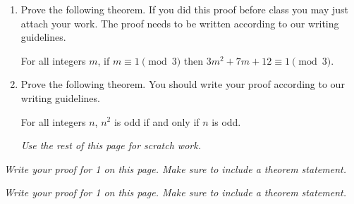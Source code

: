 \documentclass[11pt,answers]{exam}
\begin{document}
\begin{enumerate}
\item Prove the following theorem. If you did this proof before class you may just attach your work. The proof needs to be written according to our writing guidelines.

\begin{center}
For all integers $m$, if $m\equiv 1 \pmod{3}$ then $3m^2+7m+12\equiv 1 \pmod{3}$.
\end{center}


\item Prove the following theorem. You should write your proof according to our writing guidelines.

\begin{center}
For all integers $n$, $n^2$ is odd if and only if $n$ is odd.
\end{center}


\emph{Use the rest of this page for scratch work.}


\end{enumerate}

\newpage

\emph{Write your proof for 1 on this page. Make sure to include a theorem statement.}


\newpage

\emph{Write your proof for 1 on this page. Make sure to include a theorem statement.}
\end{document}
